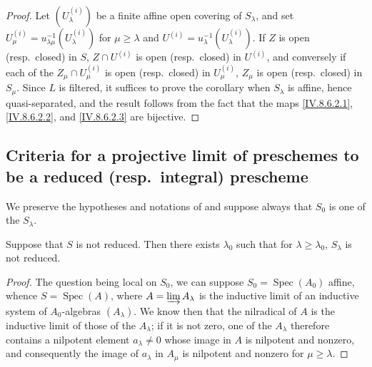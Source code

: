 \begin{proof}
Let $(U_\lambda^{(i)})$ be a finite affine open covering of $S_\lambda$, and set $U^{(i)}_\mu=u_{\lambda\mu}^{-1}(U_\lambda^{(i)})$ for $\mu\geqslant\lambda$ and $U^{(i)}=u_\lambda^{-1}(U_\lambda^{(i)})$.
If $Z$ is open (resp.\ closed) in $S$, $Z\cap U^{(i)}$ is open (resp.\ closed) in $U^{(i)}$, and conversely if each of the $Z_\mu\cap U^{(i)}_\mu$ is open (resp.\ closed) in $U^{(i)}_\mu$, $Z_\mu$ is open (resp.\ closed) in $S_\mu$.
Since $L$ is filtered, it suffices to prove the corollary when $S_\lambda$ is affine, hence quasi-separated, and the result follows from the fact that the maps \eqref{IV.8.6.2.1}, \eqref{IV.8.6.2.2}, and \eqref{IV.8.6.2.3} are bijective.
\end{proof}

\subsection{Criteria for a projective limit of preschemes to be a reduced (resp.\ integral) prescheme}
\label{subsection:IV.8.7}

We preserve the hypotheses and notations of  and suppose always that $S_0$ is one of the $S_\lambda$.

\begin{proposition}[8.7.1]
\label{IV.8.7.1}
Suppose that $S$ is not reduced.
Then there exists $\lambda_0$ such that for $\lambda\geqslant\lambda_0$, $S_\lambda$ is not reduced.
\end{proposition}

\begin{proof}
The question being local on $S_0$, we can suppose $S_0=\operatorname{Spec}(A_0)$ affine, whence $S=\operatorname{Spec}(A)$, where $A=\varinjlim A_\lambda$ is the inductive limit of an inductive system of $A_0$-algebras $(A_\lambda)$.
We know then  that the nilradical of $A$ is the inductive limit of those of the $A_\lambda$; if it is not zero, one of the $A_\lambda$ therefore contains a nilpotent element $a_\lambda\neq 0$ whose image in $A$ is nilpotent and nonzero, and consequently the image of $a_\lambda$ in $A_\mu$ is nilpotent and nonzero for $\mu\geqslant\lambda$.
\end{proof}

